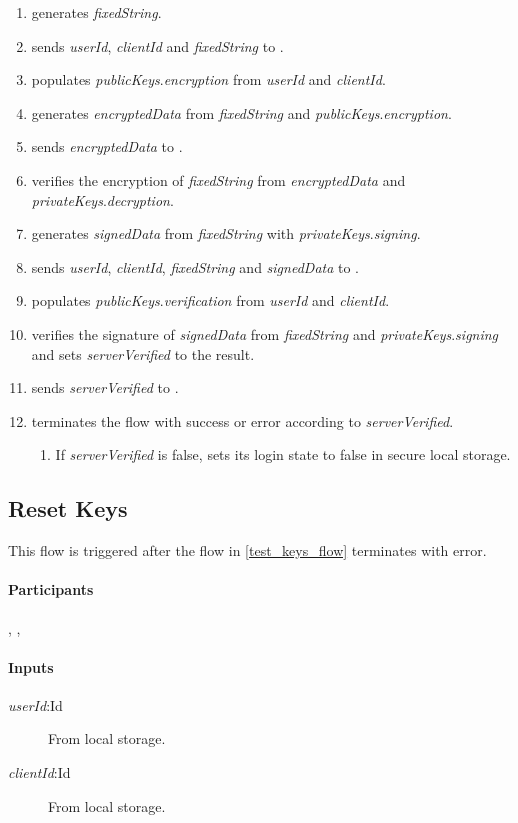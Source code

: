 \documentclass[a4paper,10pt,draft]{article}
\newcommand{\signedData}{\emph{signedData}}
\newcommand{\encryptedData}{\emph{encryptedData}}
\newcommand{\serverVerified}{\emph{serverVerified}}
\newcommand{\privateKeys}{\emph{privateKeys}}
\newcommand{\publicKeys}{\emph{publicKeys}}
\newcommand{\signingKey}{\privateKeys{}.\emph{signing}}
\newcommand{\verificationKey}{\publicKeys{}.\emph{verification}}
\newcommand{\encryptionKey}{\publicKeys{}.\emph{encryption}}
\newcommand{\decryptionKey}{\privateKeys{}.\emph{decryption}}
\newcommand{\userId}{\emph{userId}}
\newcommand{\clientId}{\emph{clientId}}
\newcommand{\fixedString}{\emph{fixedString}}
\begin{document}
\begin{enumerate}
 \item \Client{} generates \fixedString{}.
 \item \Client{} sends \userId{}, \clientId{} and \fixedString{} to \Server{}.
 \item \Server{} populates \encryptionKey{} from \userId{} and \clientId{}.
 \item \Server{} generates \encryptedData{} from \fixedString{} and \encryptionKey{}.
 \item \Server{} sends \encryptedData{} to \Client{}.
 \item \Client{} verifies the encryption of \fixedString{} from \encryptedData{} and \decryptionKey{}.
 \item \Client{} generates \signedData{} from \fixedString{} with \signingKey{}.
 \item \Client{} sends \userId{}, \clientId{}, \fixedString{} and \signedData{} to \Server{}.
 \item \Server{} populates \verificationKey{} from \userId{} and \clientId{}.
 \item \Server{} verifies the signature of \signedData{} from \fixedString{} and \signingKey{} and sets \serverVerified{} to the result.
 \item \Server{} sends \serverVerified{} to \Client{}.
 \item \Client{} terminates the flow with success or error according to \serverVerified{}.
 \begin{enumerate}
  \item If \serverVerified{} is false, \Client{} sets its login state to false in secure local storage.
 \end{enumerate}
\end{enumerate}

\subsection{Reset Keys}
\label{reset_keys_flow}
This flow is triggered after the flow in \ref{test_keys_flow} terminates with error.

\paragraph{Participants} \Client{}, \Server{}, \User{}

\paragraph{Inputs}
\SpecialItem
\begin{description}
 \item[\userId{}:Id] From \Client{} local storage.
 \item[\clientId{}:Id] From \Client{} local storage.
\end{description}
\end{document}
